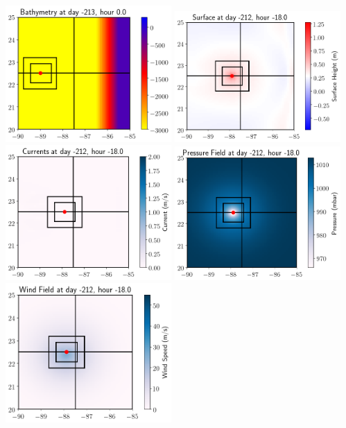 \documentclass[11pt]{article}
\begin{document}
\vskip 10pt 
\includegraphics[width=0.475\textwidth]{frame0002fig301.png}
\vskip 10pt 
\includegraphics[width=0.475\textwidth]{frame0003fig0.png}
\includegraphics[width=0.475\textwidth]{frame0003fig1.png}
\vskip 10pt 
\includegraphics[width=0.475\textwidth]{frame0003fig2.png}
\includegraphics[width=0.475\textwidth]{frame0003fig4.png}
\end{document}
